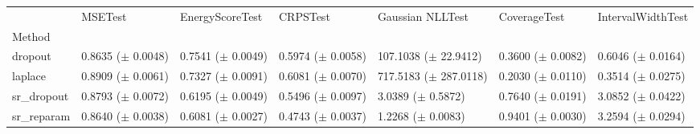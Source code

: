 \begin{tabular}{lllllll}
\toprule
 & MSETest & EnergyScoreTest & CRPSTest & Gaussian NLLTest & CoverageTest & IntervalWidthTest \\
Method &  &  &  &  &  &  \\
\midrule
dropout & \makecell{0.8635 \\ ($\pm$ 0.0048)} & \makecell{0.7541 \\ ($\pm$ 0.0049)} & \makecell{0.5974 \\ ($\pm$ 0.0058)} & \makecell{107.1038 \\ ($\pm$ 22.9412)} & \makecell{0.3600 \\ ($\pm$ 0.0082)} & \makecell{0.6046 \\ ($\pm$ 0.0164)} \\
laplace & \makecell{0.8909 \\ ($\pm$ 0.0061)} & \makecell{0.7327 \\ ($\pm$ 0.0091)} & \makecell{0.6081 \\ ($\pm$ 0.0070)} & \makecell{717.5183 \\ ($\pm$ 287.0118)} & \makecell{0.2030 \\ ($\pm$ 0.0110)} & \makecell{0.3514 \\ ($\pm$ 0.0275)} \\
sr_dropout & \makecell{0.8793 \\ ($\pm$ 0.0072)} & \makecell{0.6195 \\ ($\pm$ 0.0049)} & \makecell{0.5496 \\ ($\pm$ 0.0097)} & \makecell{3.0389 \\ ($\pm$ 0.5872)} & \makecell{0.7640 \\ ($\pm$ 0.0191)} & \makecell{3.0852 \\ ($\pm$ 0.0422)} \\
sr_reparam & \makecell{0.8640 \\ ($\pm$ 0.0038)} & \makecell{0.6081 \\ ($\pm$ 0.0027)} & \makecell{0.4743 \\ ($\pm$ 0.0037)} & \makecell{1.2268 \\ ($\pm$ 0.0083)} & \makecell{0.9401 \\ ($\pm$ 0.0030)} & \makecell{3.2594 \\ ($\pm$ 0.0294)} \\
\bottomrule
\end{tabular}
